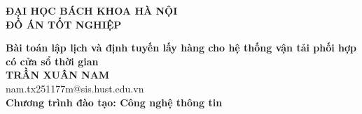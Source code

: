 \documentclass[DoAn.tex]{subfiles}
\begin{document}
\begin{titlepage}
\thispagestyle{empty}
\begin{center}

{\textbf{\large{ĐẠI HỌC BÁCH KHOA HÀ NỘI}}}\\[4cm]

{\textbf{\huge{ ĐỒ ÁN TỐT NGHIỆP}}}\\[1cm]
{\textbf{\Large{Bài toán lập lịch và định tuyến lấy hàng cho hệ thống vận tải phối hợp
có cửa sổ thời gian }}\\[1cm]

{\textbf{\large{TRẦN XUÂN NAM}}}\\
{\large{nam.tx251177m@sis.hust.edu.vn}}\\[0.5cm]

{\textbf{\large{Chương trình đào tạo: Công nghệ thông tin}}}\\

\vspace{4cm}
\begin{table}[H]
\centering
{}
\end{table}}
\end{center}



\end{titlepage}
\end{document}
